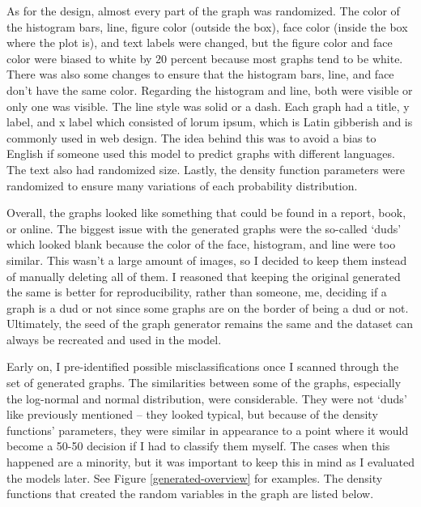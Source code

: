\documentclass[12pt]{article}
\begin{document}
            As for the design, almost every part of the graph was randomized. 
            The color of the histogram bars, line, figure color (outside the box), face color (inside the box where the plot is), 
            and text labels were changed, but the figure color and face color were biased to white by 20 percent 
            because most graphs tend to be white. There was also some changes to ensure 
            that the histogram bars, line, and face don’t have the same color. 
            Regarding the histogram and line, both were visible or only one was visible. 
            The line style was solid or a dash. Each graph had a title, y label, and x label which consisted of lorum ipsum, 
            which is Latin gibberish and is commonly used in web design. 
            The idea behind this was to avoid a bias to English if someone used this model to predict graphs with different languages. 
            The text also had randomized size. Lastly, the density function parameters were randomized 
            to ensure many variations of each probability distribution. 
            
            Overall, the graphs looked like something that could be found in a report, book, or online. 
            The biggest issue with the generated graphs were the so-called ‘duds’ which looked blank because the color of the face, 
            histogram, and line were too similar. This wasn’t a large amount of images, 
            so I decided to keep them instead of manually deleting all of them. 
            I reasoned that keeping the original generated the same is better for reproducibility, 
            rather than someone, me, deciding if a graph is a dud or not since some graphs are on the border of being a dud or not. 
            Ultimately, the seed of the graph generator remains the same and the dataset can always be recreated and used in the model.
            
            Early on, I pre-identified possible misclassifications once I scanned through the set of generated graphs. 
            The similarities between some of the graphs, especially the log-normal and normal distribution, were considerable. 
            They were not ‘duds’ like previously mentioned -- they looked typical, but because of the density functions’ parameters, 
            they were similar in appearance to a point where it would become a 50-50 decision if I had to classify them myself. 
            The cases when this happened are a minority, but it was important to keep this in mind as I evaluated the models later.
            See Figure \ref{generated-overview} for examples. The density functions that created the random variables in the graph
            are listed below.
            
\end{document}
